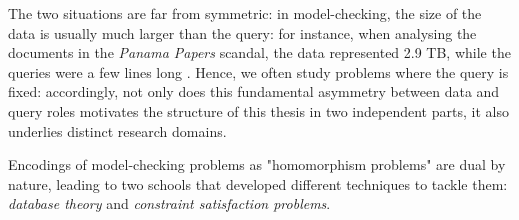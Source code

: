 The two situations are far from symmetric: in model-checking, the size of the
data is usually much larger than the query:
for instance, when analysing the documents in the \emph{Panama Papers} scandal,
the data represented 2.9 TB, while the queries were a few lines long \cite{Neo4jPanama}.
Hence, we often study problems where the query is fixed:
accordingly, not only does this fundamental asymmetry between data and query roles motivates the structure of this thesis in two independent parts, it also underlies distinct research domains.

\begin{known}
	Encodings of model-checking problems as "homomorphism problems" are dual by nature,
	leading to two schools that developed different techniques to tackle them:
	\emph{database theory} and \emph{constraint satisfaction problems}.
\end{known}


